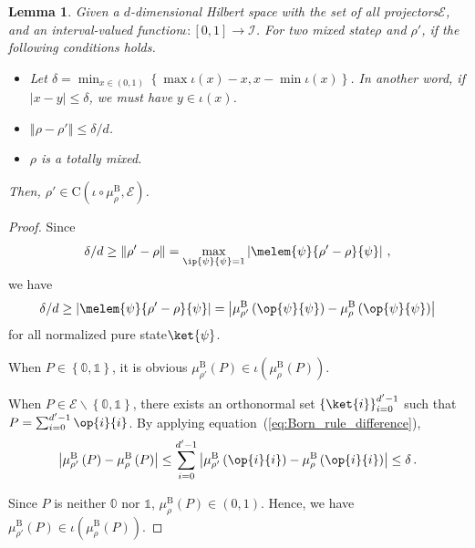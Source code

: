 \documentclass[12pt]{iopart}
\theoremstyle{plain}
\newtheorem{lemma}[thm]{Lemma}
\theoremstyle{definition}
\theoremstyle{remark}
\newcommand{\events}{\ensuremath{\mathcal{E}}}
\newcommand{\proj}[1]{\op{#1}{#1}}
\newcommand{\coreBorn}{\ensuremath{\mathrm{C}}}
\newcommand{\nb}{\nolinebreak[3] }
\begin{document}
\begin{lemma}Given a $d$-dimensional Hilbert space with the set
of all projectors\nb$\events$, and an interval-valued function\nb$\iota:\left[0,1\right]\rightarrow\mathscr{I}$.
For two mixed state\nb$\rho$ and $\rho'$, if the following conditions
holds.
\begin{itemize}
\item Let $\delta=\min_{x\in\left(0,1\right)}\left\{ \max\iota\left(x\right)-x,x-\min\iota\left(x\right)\right\} $.
In another word, if $\left|x-y\right|\le\delta$, we must have $y\in\iota\left(x\right)$.
\item $\left\Vert \rho-\rho'\right\Vert \le\delta/d$.
\item $\rho$ is a totally mixed.
\end{itemize}
Then, $\rho'\in\coreBorn\left(\iota\circ\mu_{\rho}^{\mathrm{B}},\events\right)$.\end{lemma}

\begin{proof}Since
\begin{equation}
\delta/d\ge\left\Vert \rho'-\rho\right\Vert =\max_{\ip{\psi}{\psi}=1}\left|\melem{\psi}{\rho'-\rho}{\psi}\right|\,,
\end{equation}
we have
\begin{equation}
\delta/d\ge\left|\melem{\psi}{\rho'-\rho}{\psi}\right|=\left|\mu_{\rho'}^{\mathrm{B}}\left(\proj{\psi}\right)-\mu_{\rho}^{\mathrm{B}}\left(\proj{\psi}\right)\right|\label{eq:Born_rule_difference}
\end{equation}
for all normalized pure state\nb$\ket{\psi}$.

When $P\in\left\{ \mathbb{0},\mathbb{1}\right\} $, it is obvious
$\mu_{\rho'}^{\mathrm{B}}\left(P\right)\in\iota\left(\mu_{\rho}^{\mathrm{B}}\left(P\right)\right)$.

When $P\in\events\backslash\left\{ \mathbb{0},\mathbb{1}\right\} $,
there exists an orthonormal set $\left\{ \ket{i}\right\} _{i=0}^{d'-1}$
such that $P=\sum_{i=0}^{d'-1}\proj{i}$. By applying equation~(\ref{eq:Born_rule_difference}),
\begin{equation}
\left|\mu_{\rho'}^{\mathrm{B}}\left(P\right)-\mu_{\rho}^{\mathrm{B}}\left(P\right)\right|\le\sum_{i=0}^{d'-1}\left|\mu_{\rho'}^{\mathrm{B}}\left(\proj{i}\right)-\mu_{\rho}^{\mathrm{B}}\left(\proj{i}\right)\right|\le\delta\,.
\end{equation}

Since $P$ is neither $\mathbb{0}$ nor $\mathbb{1}$, $\mu_{\rho}^{\mathrm{B}}\left(P\right)\in\left(0,1\right)$.
Hence, we have $\mu_{\rho'}^{\mathrm{B}}\left(P\right)\in\iota\left(\mu_{\rho}^{\mathrm{B}}\left(P\right)\right)$.\end{proof}
\end{document}
